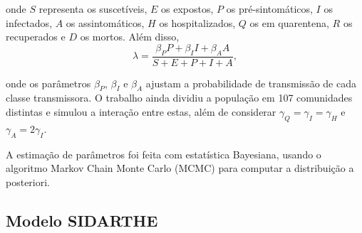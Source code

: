 \documentclass{article}
\begin{document}
\noindent onde $S$ representa os suscetíveis, $E$ os expostos, $P$ os pré-sintomáticos, $I$ os infectados, $A$ os assintomáticos, $H$ os hospitalizados, $Q$ os em quarentena, $R$ os recuperados e $D$ os mortos. Além disso, 
\[\lambda = \frac{\beta_P P + \beta_I I + \beta_A A}{S + E + P + I + A},\]

\noindent onde os parâmetros $\beta_P$, $\beta_I$ e $\beta_A$ ajustam a probabilidade de transmissão de cada classe transmissora. O trabalho ainda dividiu a população em 107 comunidades distintas e simulou a interação entre estas, além de considerar $\gamma_Q = \gamma_I = \gamma_H$ e $\gamma_A = 2\gamma_I$.

A estimação de parâmetros foi feita com estatística Bayesiana, usando o algoritmo Markov Chain Monte Carlo (MCMC) para computar a distribuição a posteriori.

\subsection{Modelo SIDARTHE}
\end{document}
